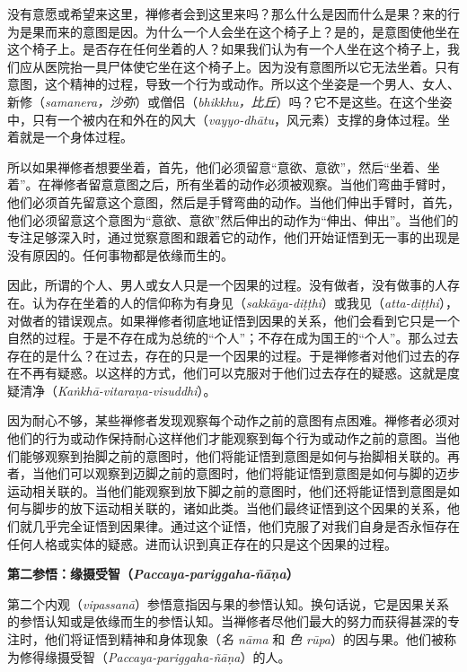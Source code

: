 没有意愿或希望来这里，禅修者会到这里来吗？那么什么是因而什么是果？来的行为是果而来的意图是因。为什么一个人会坐在这个椅子上？是的，是意图使他坐在这个椅子上。是否存在任何坐着的人？如果我们认为有一个人坐在这个椅子上，我们应从医院抬一具尸体使它坐在这个椅子上。因为没有意图所以它无法坐着。只有意图，这个精神的过程，导致一个行为或动作。所以这个坐姿是一个男人、女人、新修（{\it samanera，沙弥}）或僧侣（{\it bhikkhu，比丘}）吗？它不是这些。在这个坐姿中，只有一个被内在和外在的风大（{\it vayyo-dh\=atu}，风元素）支撑的身体过程。坐着就是一个身体过程。

所以如果禅修者想要坐着，首先，他们必须留意“意欲、意欲”，然后“坐着、坐着”。在禅修者留意意图之后，所有坐着的动作必须被观察。当他们弯曲手臂时，他们必须首先留意这个意图，然后是手臂弯曲的动作。当他们伸出手臂时，首先，他们必须留意这个意图为“意欲、意欲”然后伸出的动作为“伸出、伸出”。当他们的专注足够深入时，通过觉察意图和跟着它的动作，他们开始证悟到无一事的出现是没有原因的。任何事物都是依缘而生的。

因此，所谓的个人、男人或女人只是一个因果的过程。没有做者，没有做事的人存在。认为存在坐着的人的信仰称为有身见（{\it sakk\=aya-di\d t\d thi}）或我\1见（{\it atta-di\d t\d thi}），对做者的错误观点。如果禅修者彻底地证悟到因果的关系，他们会看到它只是一个自然的过程。于是不存在成为总统的“个人”；不存在成为国王的“个人”。那么过去存在的是什么？在过去，存在的只是一个因果的过程。于是禅修者对他们过去的存在不再有疑惑。以这样的方式，他们可以克服对于他们过去存在的疑惑。这就是度疑清净（{\it Ka\.nkh\=a-vitara\d na-visuddhi}）。

因为耐心不够，某些禅修者发现观察每个动作之前的意图有点困难。禅修者必须对他们的行为或动作保持耐心这样他们才能观察到每个行为或动作之前的意图。当他们能够观察到抬脚之前的意图时，他们将能证悟到意图是如何与抬脚相关联的。再者，当他们可以观察到迈脚之前的意图时，他们将能证悟到意图是如何与脚的迈步运动相关联的。当他们能观察到放下脚之前的意图时，他们还将能证悟到意图是如何与脚步的放下运动相关联的，诸如此类。当他们最终证悟到这个因果的关系，他们就几乎完全证悟到因果律。通过这个证悟，他们克服了对我们自身是否永恒存在任何人格或实体的疑惑。进而认识到真正存在的只是这个因果的过程。

{\medbreak\bf \1第二参悟：缘摄受智（{\it Paccaya-pariggaha-\~n\=a\d na}）\smallbreak}

第二个内观（{\it vipassan\=a}）参悟意指因与果的参悟认知。换句话说，它是因果关系的参悟认知或是依缘而生的参悟认知。当禅修者尽他们最大的努力而获得甚深的专注时，他们将证悟到精神和身体现象（{\it 名 n\=ama} 和 {\it 色 r\=upa}）的因与果。他们被称为修得缘摄受智（{\it Paccaya-pariggaha-\~n\=a\d na}）的人。

